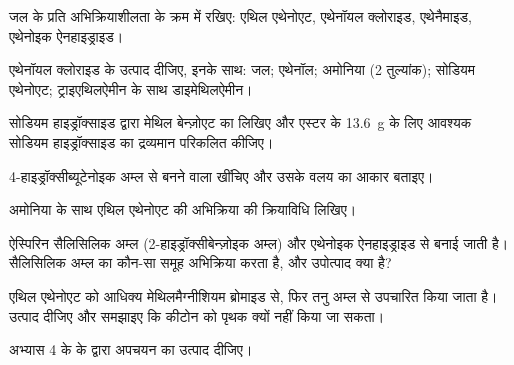 \begin{exercise}[$\star$]\label{exo:b2:acyl-substitution:1}
जल के प्रति अभिक्रियाशीलता के क्रम में रखिए: एथिल एथेनोएट, एथेनॉयल क्लोराइड, एथेनैमाइड, एथेनोइक
ऐनहाइड्राइड।
\end{exercise}

\begin{exercise}[$\star$]\label{exo:b2:acyl-substitution:2}
एथेनॉयल क्लोराइड के उत्पाद दीजिए, इनके साथ: जल; एथेनॉल; अमोनिया (2 तुल्यांक);
सोडियम एथेनोएट; ट्राइएथिलऐमीन के साथ डाइमेथिलऐमीन।
\end{exercise}

\begin{exercise}[$\star$]\label{exo:b2:acyl-substitution:3}
सोडियम हाइड्रॉक्साइड द्वारा मेथिल बेन्ज़ोएट का  लिखिए और एस्टर के \qty{13.6}{g} के लिए आवश्यक सोडियम
हाइड्रॉक्साइड का द्रव्यमान परिकलित कीजिए।
\end{exercise}

\begin{exercise}[$\star$]\label{exo:b2:acyl-substitution:4}
4-हाइड्रॉक्सीब्यूटेनोइक अम्ल से बनने वाला  खींचिए और उसके वलय का आकार बताइए।
\end{exercise}

\begin{exercise}[$\star\star$]\label{exo:b2:acyl-substitution:5}
अमोनिया के साथ एथिल एथेनोएट की अभिक्रिया की क्रियाविधि लिखिए।
\end{exercise}

\begin{exercise}[$\star\star$]\label{exo:b2:acyl-substitution:6}
ऐस्पिरिन सैलिसिलिक अम्ल (2-हाइड्रॉक्सीबेन्ज़ोइक अम्ल) और एथेनोइक ऐनहाइड्राइड से बनाई जाती है। सैलिसिलिक अम्ल का
कौन-सा समूह अभिक्रिया करता है, और उपोत्पाद क्या है?
\end{exercise}

\begin{exercise}[$\star\star$]\label{exo:b2:acyl-substitution:7}
एथिल एथेनोएट को आधिक्य मेथिलमैग्नीशियम ब्रोमाइड से, फिर तनु अम्ल से उपचारित किया जाता है।
उत्पाद दीजिए और समझाइए कि कीटोन को पृथक क्यों नहीं किया जा सकता।
\end{exercise}

\begin{exercise}[$\star\star$]\label{exo:b2:acyl-substitution:8}
अभ्यास 4 के  के  द्वारा अपचयन का उत्पाद दीजिए।
\end{exercise}

